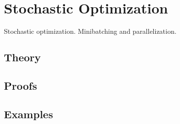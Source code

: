 
\section{Stochastic Optimization}
\label{sec:2.4.17-stochastic-optimization}

\begin{ticket}
Stochastic optimization. Minibatching and parallelization.
\end{ticket}

\subsection*{Theory}

\subsection*{Proofs}

\subsection*{Examples}
